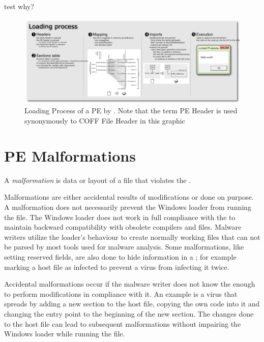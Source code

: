 test \cite{peloading} why?

\begin{figure}
\includegraphics[height=.39\textheight,keepaspectratio]{graphics/pe101}
\caption{ Loading Process of a PE by . Note that the term PE Header is used synonymously to COFF File Header in this graphic}
\label{fig:loading} 
\end{figure}


\section{PE Malformations}

\begin{definition}[Malformation]
A \emph{malformation} is data or layout of a \PE{} file that violates the \PECOFF{}.
\end{definition} 

Malformations are either accidental results of \PE{} modifications or done on purpose.
A malformation does not necessarily prevent the Windows loader from running the file. The Windows loader does not work in full compliance with the \PECOFF{} to maintain backward compatibility with obsolete compilers and files. Malware writers utilize the loader's behaviour to create normally working \PE{} files that can not be parsed by most tools used for malware analysis. Some malformations, like setting reserved fields, are also done to hide information in a \PE{}; for example marking a host file as infected to prevent a virus from infecting it twice.

Accidental malformations occur if the malware writer does not know the \PECOFF{} enough to perform modifications in compliance with it. An example is a virus that spreads by adding a new section to the host file, copying the own code into it and changing the entry point to the beginning of the new section. The changes done to the host file can lead to subsequent malformations without impairing the Windows loader while running the file.

